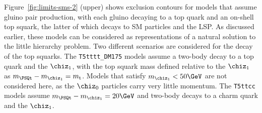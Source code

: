 Figure~\ref{fig:limits-sms-2} (upper) shows exclusion contours for
models that assume gluino pair production, with each gluino decaying
to a top quark and an on-shell top squark, the latter of which decays
to SM particles and the LSP. As discussed earlier, these
models can be considered as representations of a natural solution
to the little hierarchy problem. Two different scenarios are
considered for the decay of the top squarks. The
\texttt{T5tttt\_DM175} models assume a two-body decay to a top quark
and the $\chiz_1$, with the top squark mass defined relative to the
$\chiz_1$ as $m_{\PSQt} - m_{\chiz_1} = m_\text{t}$. Models that
satisfy $m_{\chiz_1} < 50\GeV$ are not considered here, as the
$\chiz_0$ particles carry very little momentum.  The \texttt{T5ttcc}
models assume $m_{\PSQt} - m_{\chiz_1} = 20\GeV$ and two-body decays
to a charm quark and the $\chiz_1$.

